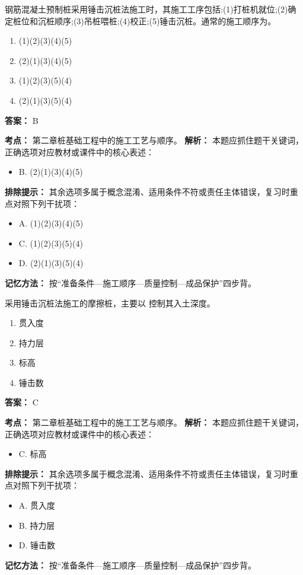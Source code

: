 \documentclass[UTF8,fontset=fandol,11pt]{ctexart}
\begin{document}
\begin{quizbox}[title={第 7 题}]
钢筋混凝土预制桩采用锤击沉桩法施工时，其施工工序包括:(1)打桩机就位;(2)确定桩位和沉桩顺序;(3)吊桩喂桩;(4)校正;(5)锤击沉桩。通常的施工顺序为。\\
\begin{enumerate}[label=\Alph*.]
\item (1)(2)(3)(4)(5)
\item (2)(1)(3)(4)(5)
\item (1)(2)(3)(5)(4)
\item (2)(1)(3)(5)(4)
\end{enumerate}
\textbf{答案：} B
\vspace{0.25em}
\begin{answerbox}[title={考点解析}]
\textbf{考点：} 第二章桩基础工程中的施工工艺与顺序。
\textbf{解析：} 本题应抓住题干关键词，正确选项对应教材或课件中的核心表述：
\begin{itemize}
\item B. (2)(1)(3)(4)(5)
\end{itemize}
\textbf{排除提示：} 其余选项多属于概念混淆、适用条件不符或责任主体错误，复习时重点对照下列干扰项：
\begin{itemize}
\item A. (1)(2)(3)(4)(5)
\item C. (1)(2)(3)(5)(4)
\item D. (2)(1)(3)(5)(4)
\end{itemize}
\textbf{记忆方法：} 按“准备条件—施工顺序—质量控制—成品保护”四步背。
\end{answerbox}
\end{quizbox}

\begin{quizbox}[title={第 8 题}]
采用锤击沉桩法施工的摩擦桩，主要以 控制其入土深度。\\
\begin{enumerate}[label=\Alph*.]
\item 贯入度
\item 持力层
\item 标高
\item 锤击数
\end{enumerate}
\textbf{答案：} C
\vspace{0.25em}
\begin{answerbox}[title={考点解析}]
\textbf{考点：} 第二章桩基础工程中的施工工艺与顺序。
\textbf{解析：} 本题应抓住题干关键词，正确选项对应教材或课件中的核心表述：
\begin{itemize}
\item C. 标高
\end{itemize}
\textbf{排除提示：} 其余选项多属于概念混淆、适用条件不符或责任主体错误，复习时重点对照下列干扰项：
\begin{itemize}
\item A. 贯入度
\item B. 持力层
\item D. 锤击数
\end{itemize}
\textbf{记忆方法：} 按“准备条件—施工顺序—质量控制—成品保护”四步背。
\end{answerbox}
\end{quizbox}
\end{document}

